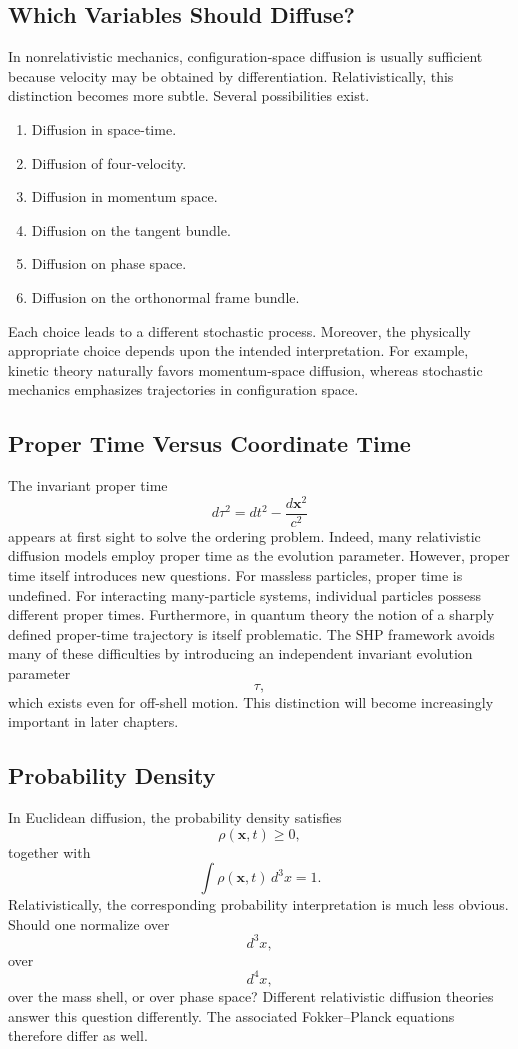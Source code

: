 \subsection{Which Variables Should Diffuse?}
In nonrelativistic mechanics,
configuration-space diffusion is usually sufficient because velocity may
be obtained by differentiation.
Relativistically,
this distinction becomes more subtle.
Several possibilities exist.
\begin{enumerate}
\item
Diffusion in space-time.
\item
Diffusion of four-velocity.
\item
Diffusion in momentum space.
\item
Diffusion on the tangent bundle.
\item
Diffusion on phase space.
\item
Diffusion on the orthonormal frame bundle.
\end{enumerate}
Each choice leads to a different stochastic process.
Moreover,
the physically appropriate choice depends upon the intended
interpretation.
For example,
kinetic theory naturally favors momentum-space diffusion,
whereas stochastic mechanics emphasizes trajectories in configuration
space.
\subsection{Proper Time Versus Coordinate Time}
The invariant proper time
\[d\tau^2=dt^2-\frac{d\mathbf x^2}{c^2}\]
appears at first sight to solve the ordering problem.
Indeed,
many relativistic diffusion models employ proper time as the evolution
parameter.
However,
proper time itself introduces new questions.
For massless particles,
proper time is undefined.
For interacting many-particle systems,
individual particles possess different proper times.
Furthermore,
in quantum theory the notion of a sharply defined proper-time trajectory
is itself problematic.
The SHP framework avoids many of these difficulties by introducing an
independent invariant evolution parameter
\[\tau,\]
which exists even for off-shell motion.
This distinction will become increasingly important in later chapters.
\subsection{Probability Density}
In Euclidean diffusion,
the probability density satisfies
\[\rho(\mathbf x,t)\ge0,\]
together with
\[\int\rho(\mathbf x,t)\,d^3x=1.\]
Relativistically,
the corresponding probability interpretation is much less obvious.
Should one normalize over
\[d^3x,\]
over
\[d^4x,\]
over the mass shell,
or over phase space?
Different relativistic diffusion theories answer this question
differently.
The associated Fokker--Planck equations therefore differ as well.

